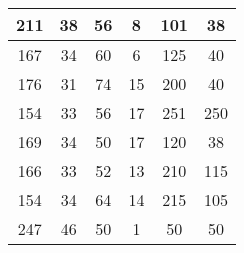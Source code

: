 \documentclass[withoutpreface]{cumcmthesis}
\begin{document}
\begin{table}[H]
\begin{tabular}{|c|c|c|c|c|c|}
        \rowcolor[rgb]{ .867,  .922,  .969} 211              & 38               & 56               & \cellcolor[rgb]{ .886,  .937,  .855}8                    & \cellcolor[rgb]{ .886,  .937,  .855}101                & \cellcolor[rgb]{ .886,  .937,  .855}38 \bigstrut                \\
        \hline
        \rowcolor[rgb]{ .867,  .922,  .969} 167              & 34               & 60               & \cellcolor[rgb]{ .886,  .937,  .855}6                    & \cellcolor[rgb]{ .886,  .937,  .855}125                & \cellcolor[rgb]{ .886,  .937,  .855}40 \bigstrut                \\
        \hline
        \rowcolor[rgb]{ .867,  .922,  .969} 176              & 31               & 74               & \cellcolor[rgb]{ .886,  .937,  .855}15                   & \cellcolor[rgb]{ .886,  .937,  .855}200                & \cellcolor[rgb]{ .886,  .937,  .855}40 \bigstrut                \\
        \hline
        \rowcolor[rgb]{ .867,  .922,  .969} 154              & 33               & 56               & \cellcolor[rgb]{ .886,  .937,  .855}17                   & \cellcolor[rgb]{ .886,  .937,  .855}251                & \cellcolor[rgb]{ .886,  .937,  .855}250 \bigstrut               \\
        \hline
        \rowcolor[rgb]{ .867,  .922,  .969} 169              & 34               & 50               & \cellcolor[rgb]{ .886,  .937,  .855}17                   & \cellcolor[rgb]{ .886,  .937,  .855}120                & \cellcolor[rgb]{ .886,  .937,  .855}38 \bigstrut                \\
        \hline
        \rowcolor[rgb]{ .867,  .922,  .969} 166              & 33               & 52               & \cellcolor[rgb]{ .886,  .937,  .855}13                   & \cellcolor[rgb]{ .886,  .937,  .855}210                & \cellcolor[rgb]{ .886,  .937,  .855}115 \bigstrut               \\
        \hline
        \rowcolor[rgb]{ .867,  .922,  .969} 154              & 34               & 64               & \cellcolor[rgb]{ .886,  .937,  .855}14                   & \cellcolor[rgb]{ .886,  .937,  .855}215                & \cellcolor[rgb]{ .886,  .937,  .855}105 \bigstrut               \\
        \hline
        \rowcolor[rgb]{ .867,  .922,  .969} 247              & 46               & 50               & \cellcolor[rgb]{ .886,  .937,  .855}1                    & \cellcolor[rgb]{ .886,  .937,  .855}50                 & \cellcolor[rgb]{ .886,  .937,  .855}50 \bigstrut                \\

\end{tabular}
\end{table}
\end{document}
